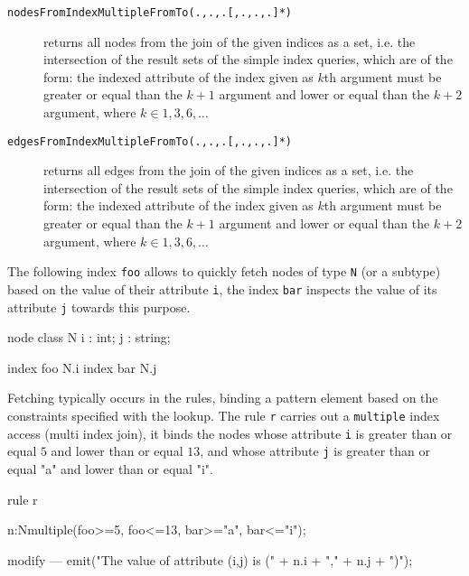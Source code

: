 \begin{description}
\item[\texttt{nodesFromIndexMultipleFromTo(.,.,.[,.,.,.]*)}] returns all nodes from the join of the given indices as a set, i.e. the intersection of the result sets of the simple index queries, which are of the form: the indexed attribute of the index given as $k$th argument must be greater or equal than the $k + 1$ argument and lower or equal than the $k + 2$ argument, where $k \in 1, 3, 6, \ldots$
\item[\texttt{edgesFromIndexMultipleFromTo(.,.,.[,.,.,.]*)}] returns all edges from the join of the given indices as a set, i.e. the intersection of the result sets of the simple index queries, which are of the form: the indexed attribute of the index given as $k$th argument must be greater or equal than the $k + 1$ argument and lower or equal than the $k + 2$ argument, where $k \in 1, 3, 6, \ldots$
\end{description}


\begin{example}\label{ex:multiindexaccess}
The following index \texttt{foo} allows to quickly fetch nodes of type \texttt{N} (or a subtype) based on the value of their attribute \texttt{i}, the index \texttt{bar} inspects the value of its attribute \texttt{j} towards this purpose.

\begin{grgen}
node class N
{
  i : int;
  j : string;
}

index foo { N.i }
index bar { N.j }
\end{grgen}

Fetching typically occurs in the rules, binding a pattern element based on the constraints specified with the lookup.
The rule \texttt{r} carries out a \texttt{multiple} index access (multi index join), it binds the nodes whose attribute \texttt{i} is greater than or equal $5$ and lower than or equal $13$, and whose attribute \texttt{j} is greater than or equal "a" and lower than or equal "i".

\begin{grgen}
rule r {
  n:N{multiple(foo>=5, foo<=13, bar>="a", bar<="i")};

  modify {
  ---
    emit("The value of attribute (i,j) is (" + n.i + "," + n.j + ")\n");
  }
}
\end{grgen}

\end{example}

